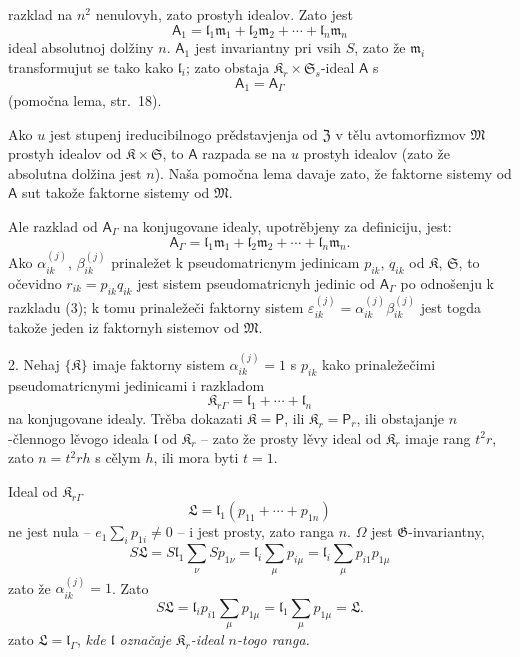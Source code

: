 \documentclass[11pt]{article}
\begin{document}
razklad na \(n^2\) nenulovyh, zato prostyh idealov. Zato jest
\[
\mathsf{A}_1=\mathfrak l_1\mathfrak m_1+\mathfrak l_2\mathfrak m_2+\cdots+\mathfrak l_n\mathfrak m_n
\]
ideal absolutnoj dolžiny \(n\). \(\mathsf{A}_1\) jest invariantny pri vsih \(S\), zato že \(\mathfrak m_i\) transformujut se tako kako \(\mathfrak l_i\); zato obstaja \(\mathfrak K_r\times\mathfrak S_s\)-ideal \(\mathsf{A}\) s
\[
\mathsf{A}_1=\mathsf{A}_\Gamma
\]
(pomočna lema, str.~18).

Ako \(u\) jest stupenj ireducibilnogo prědstavjenja od \(\mathfrak Z\) v tělu avtomorfizmov \(\mathfrak M\) prostyh idealov od \(\mathfrak K\times\mathfrak S\), to \(\mathsf{A}\) razpada se na \(u\) prostyh idealov (zato že absolutna dolžina jest \(n\)). Naša pomočna lema davaje zato, že faktorne sistemy od \(\mathsf{A}\) sut takože faktorne sistemy od \(\mathfrak M\).

Ale razklad od \(\mathsf{A}_\Gamma\) na konjugovane idealy, upotrěbjeny za definiciju, jest:
\[
\tag{3}
\mathsf{A}_\Gamma=\mathfrak l_1\mathfrak m_1+\mathfrak l_2\mathfrak m_2+\cdots+\mathfrak l_n\mathfrak m_n.
\]
Ako \(\alpha_{ik}^{(j)}\), \(\beta_{ik}^{(j)}\) prinaležet k pseudomatricnym jedinicam \(p_{ik}\), \(q_{ik}\) od \(\mathfrak K\), \(\mathfrak S\), to očevidno \(r_{ik}=p_{ik}q_{ik}\) jest sistem pseudomatricnyh jedinic od \(\mathsf{A}_\Gamma\) po odnošenju k razkladu (3); k tomu prinaležeči faktorny sistem \(\varepsilon_{ik}^{(j)}=\alpha_{ik}^{(j)}\beta_{ik}^{(j)}\) jest togda takože jeden iz faktornyh sistemov od \(\mathfrak M\).

2. Nehaj \(\{\mathfrak K\}\) imaje faktorny sistem \(\alpha_{ik}^{(j)}=1\) s \(p_{ik}\) kako prinaležečimi pseudomatricnymi jedinicami i razkladom
\[
\mathfrak K_{r\Gamma}=\mathfrak l_1+\cdots+\mathfrak l_n
\]
na konjugovane idealy. Trěba dokazati \(\mathfrak K=\mathsf P\), ili \(\mathfrak K_r=\mathsf P_r\), ili obstajanje \(n\)-člennogo lěvogo ideala \(\mathfrak l\) od \(\mathfrak K_r\) -- zato že prosty lěvy ideal od \(\mathfrak K_r\) imaje rang \(t^2r\), zato \(n=t^2rh\) s cělym \(h\), ili mora byti \(t=1\).

Ideal od \(\mathfrak K_{r\Gamma}\)
\[
\mathfrak L=\mathfrak l_1(p_{11}+\cdots+p_{1n})
\]
ne jest nula -- \(e_1\sum_i p_{1i}\ne0\) -- i jest prosty, zato ranga \(n\). \(\Omega\) jest \(\mathfrak G\)-invariantny,
\[
S\mathfrak L
=S\mathfrak l_1\sum_\nu S p_{1\nu}
=\mathfrak l_i\sum_\mu p_{i\mu}
=\mathfrak l_i\sum_\mu p_{i1}p_{1\mu}
\]
zato že \(\alpha_{ik}^{(j)}=1\). Zato
\[
S\mathfrak L=\mathfrak l_ip_{i1}\sum_\mu p_{1\mu}
=\mathfrak l_1\sum_\mu p_{1\mu}
=\mathfrak L.
\]
zato \(\mathfrak L=\mathfrak l_\Gamma\), \emph{kde \(\mathfrak l\) označaje \(\mathfrak K_r\)-ideal \(n\)-togo ranga.}
\end{document}
